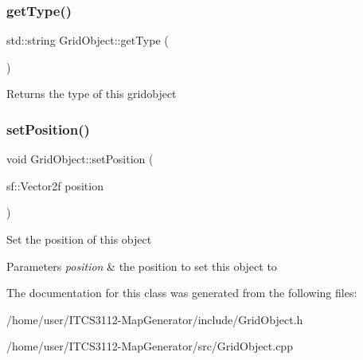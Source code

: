 \subsubsection{\texorpdfstring{get\+Type()}{getType()}}
{\footnotesize\ttfamily std\+::string Grid\+Object\+::get\+Type (\begin{DoxyParamCaption}{ }\end{DoxyParamCaption})}

\begin{DoxyReturn}{Returns}
the type of this gridobject 
\end{DoxyReturn}
\mbox{\label{classGridObject_a800ff827249cdd246254cf57f9a1d152}} 
\subsubsection{\texorpdfstring{set\+Position()}{setPosition()}}
{\footnotesize\ttfamily void Grid\+Object\+::set\+Position (\begin{DoxyParamCaption}\item[{sf\+::\+Vector2f}]{position }\end{DoxyParamCaption})}

Set the position of this object


\begin{DoxyParams}{Parameters}
{\em position} & the position to set this object to \\
\hline
\end{DoxyParams}


The documentation for this class was generated from the following files\+:\begin{DoxyCompactItemize}
\item 
/home/user/\+I\+T\+C\+S3112-\/\+Map\+Generator/include/Grid\+Object.\+h\item 
/home/user/\+I\+T\+C\+S3112-\/\+Map\+Generator/src/Grid\+Object.\+cpp\end{DoxyCompactItemize}
